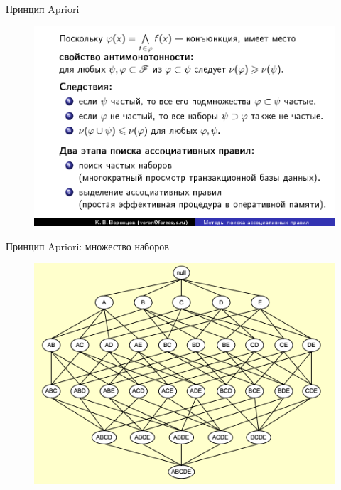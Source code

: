 \documentclass{beamer}
\begin{document}
\begin{frame}{Принцип Apriori}
\begin{figure}[h]
\centering
\includegraphics[scale=0.45]{images/lec08-pic09.png}
\end{figure}
\end{frame}

\begin{frame}{Принцип Apriori: множество наборов}
\begin{figure}[h]
\centering
\includegraphics[scale=0.75]{images/lec08-pic10.png}
\end{figure}
\end{frame}
\end{document}
